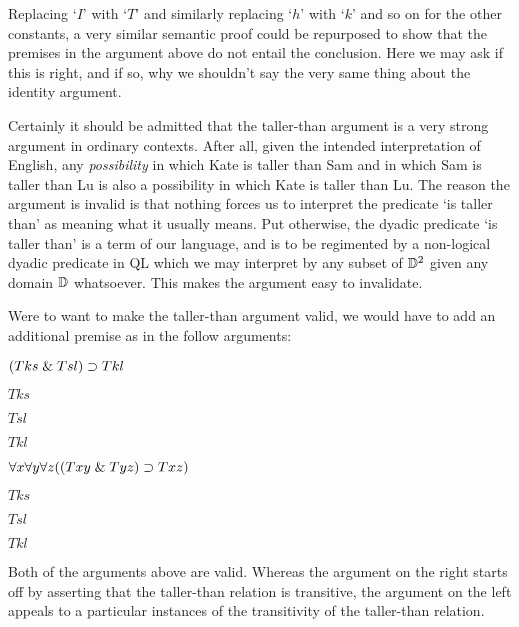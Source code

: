 Replacing `$I$' with `$T$' and similarly replacing `$h$' with `$k$' and so on for the other constants, a very similar semantic proof could be repurposed to show that the premises in the argument above do not entail the conclusion.
Here we may ask if this is right, and if so, why we shouldn't say the very same thing about the identity argument.

Certainly it should be admitted that the taller-than argument is a very strong argument in ordinary contexts.
After all, given the intended interpretation of English, any \textit{possibility} in which Kate is taller than Sam and in which Sam is taller than Lu is also a possibility in which Kate is taller than Lu. 
The reason the argument is invalid is that nothing forces us to interpret the predicate `is taller than' as meaning what it usually means.
Put otherwise, the dyadic predicate `is taller than' is a  term of our language, and is to be regimented by a non-logical dyadic predicate in QL which we may interpret by any subset of $\mathbb{D}^2$ given any domain $\mathbb{D}$ whatsoever. 
This makes the argument easy to invalidate.

Were to want to make the taller-than argument valid, we would have to add an additional premise as in the follow arguments:

\begin{multicols}{2}
  
\begin{earg}
  \item[] $(Tks \mathrel\& Tsl) \supset Tkl$
  \item[] $Tks$
  \item[] $Tsl$
  \item[\therefore] $Tkl$
\end{earg}

\begin{earg}
  \item[] $\forall x\forall y \forall z((Txy \mathrel\& Tyz) \supset Txz)$
  \item[] $Tks$
  \item[] $Tsl$
  \item[\therefore] $Tkl$
\end{earg}

\end{multicols}

Both of the arguments above are valid.
Whereas the argument on the right starts off by asserting that the taller-than relation is transitive, the argument on the left appeals to a particular instances of the transitivity of the taller-than relation.

